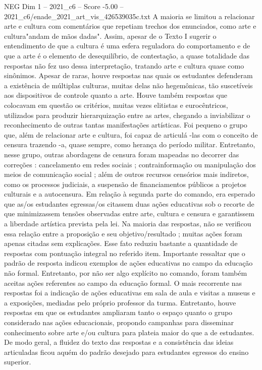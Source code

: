 \begin{textsample}{NEG Dim 1 – 2021\_c6 – Score -5.00 – 2021\_c6/enade\_2021\_art\_vis\_426539035c.txt}
A maioria se limitou a relacionar arte e cultura com comentários que repetiam trechos dos enunciados, como arte e cultura"andam de mãos dadas".
Assim, apesar de o Texto I sugerir o entendimento de que a cultura é uma esfera reguladora do comportamento e de que a arte é o elemento de desequilíbrio, de contestação, a quase totalidade das respostas não fez uso dessa interpretação, tratando arte e cultura quase como sinônimos.
Apesar de raras, houve respostas nas quais os estudantes defenderam a existência de múltiplas culturas, muitas delas não hegemônicas, tão suscetíveis aos dispositivos de controle quanto a arte.
Houve também respostas que colocavam em questão os critérios, muitas vezes elitistas e eurocêntricos, utilizados para produzir hierarquização entre as artes, chegando a inviabilizar o reconhecimento de outras tantas manifestações artísticas.
Foi pequeno o grupo que, além de relacionar arte e cultura, foi capaz de articulá -las com o conceito de censura trazendo -a, quase sempre, como herança do período militar.
Entretanto, nesse grupo, outras abordagens de censura foram mapeadas no decorrer das correções : cancelamento em redes sociais ; contrainformação ou manipulação dos meios de comunicação social ; além de outros recursos censórios mais indiretos, como os processos judiciais, a suspensão de financiamentos públicos a projetos culturais e a autocensura.
Em relação à segunda parte do comando, era esperado que as/os estudantes egressas/os citassem duas ações educativas sob o recorte de que minimizassem tensões observadas entre arte, cultura e censura e garantissem a liberdade artística prevista pela lei.
Na maioria das respostas, não se verificou essa relação entre a proposição e seu objetivo/resultado ; muitas ações foram apenas citadas sem explicações.
Esse fato reduziu bastante a quantidade de respostas com pontuação integral no referido item.
Importante ressaltar que o padrão de resposta indicou exemplos de ações educativas no campo da educação não formal.
Entretanto, por não ser algo explícito no comando, foram também aceitas ações referentes ao campo da educação formal.
O mais recorrente nas respostas foi a indicação de ações educativas em sala de aula e visitas a museus e a exposições, mediadas pelo próprio professor da turma.
Entretanto, houve respostas em que os estudantes ampliaram tanto o espaço quanto o grupo considerado nas ações educacionais, propondo campanhas para disseminar conhecimento sobre arte e/ou cultura para plateia maior do que a de estudantes.
De modo geral, a fluidez do texto das respostas e a consistência das ideias articuladas ficou aquém do padrão desejado para estudantes egressos do ensino superior.

\end{textsample}
